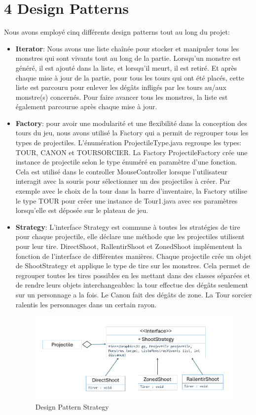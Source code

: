 \documentclass{report}
\begin{document}
\section*{4 Design Patterns}

Nous avons employé cinq différents design patterns tout au long du projet:\\

\begin{itemize}
  \item \textbf{Iterator}: Nous avons une liste chaînée pour stocker et manipuler tous les monstres qui sont vivants tout au long de la partie. Lorsqu'un monstre est généré, il est ajouté dans la liste, et lorsqu'il meurt, il est retiré. Et après chaque mise à jour de la partie, pour tous les tours qui ont été placés, cette liste est parcouru pour enlever les dégâts infligés par les tours au/aux monstre(s) concernés. Pour faire avancer tous les monstres, la liste est également parcourue après chaque mise à jour.
  \item \textbf{Factory}: pour avoir une modularité et une flexibilité dans la conception des tours du jeu, nous avons utilisé la Factory qui a permit de regrouper tous les types de projectiles.
L’énumération ProjectileType.java regroupe les types: TOUR, CANON et TOUR\textunderscore SORCIER.
La Factory ProjectileFactory crée une instance de projectile selon le type énuméré en paramètre d’une fonction.
Cela est utilisé dans le controller MouseController lorsque l’utilisateur interagit avec la souris pour sélectionner un des projectiles à créer. Par exemple avec le choix de la tour dans la barre d’inventaire, la Factory utilise le type TOUR pour créer une instance de Tour1.java avec ses paramètres lorsqu’elle est déposée sur le plateau de jeu.
	\item \textbf{Strategy}: L’interface Strategy est commune à toutes les stratégies de tire pour chaque projectile, elle déclare une méthode que les projectiles utilisent pour leur tire.
DirectShoot, RallentirShoot et ZonedShoot implémentent la fonction de l’interface de différentes manières.
Chaque projectile crée un objet de ShootStrategy et applique le type de tire sur les monstres. Cela permet de regrouper toutes les tires possibles en les mettant dans des classes séparées et de rendre leurs objets interchangeables: la tour effectue des dégâts seulement sur un personnage a la fois. Le Canon fait des dégâts de zone. La Tour sorcier ralentis les personnages dans un certain rayon.\\
\begin{figure}[!ht]
	\centering
	\includegraphics[scale=.5]{Strategy}
	\caption{Design Pattern Strategy}
	\end{figure}
	

\end{itemize}
\end{document}
